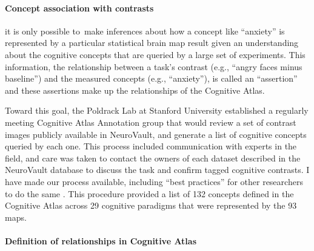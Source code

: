 \documentclass{report}
\begin{document}
\paragraph{Concept association with contrasts}

it is only possible to~make inferences about how a concept like
``anxiety'' is represented by a particular statistical brain map result
given an understanding about the cognitive concepts that are queried by
a large set of experiments. This information, the relationship between a
task's contrast (e.g., ``angry faces minus baseline'') and the measured
concepts (e.g., ``anxiety''), is called an ``assertion'' and these
assertions make up the relationships of the Cognitive Atlas.

Toward this goal, the Poldrack Lab at Stanford University established a
regularly meeting Cognitive Atlas Annotation group that would review a
set of contrast images publicly available in NeuroVault, and generate a list of cognitive concepts queried by each
one. This process included communication with experts in the field, and
care was taken to contact the owners of each dataset described in the
NeuroVault database to discuss the task and confirm tagged cognitive
contrasts. I have made our process available, including ``best
practices'' for other researchers to do the same \cite{Vsoch_undated-gw}.
This procedure provided a list of 132 concepts defined in the Cognitive
Atlas across 29 cognitive paradigms that were represented by the 93
maps.

\paragraph{Definition of relationships in Cognitive Atlas}
\end{document}
